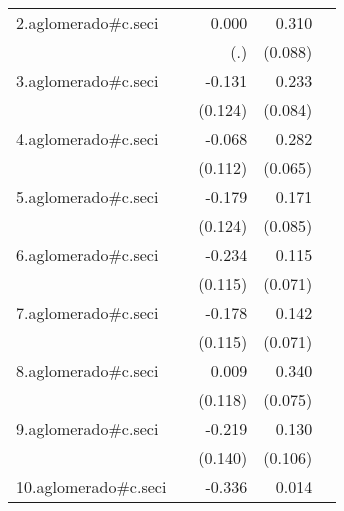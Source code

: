{\begin{longtable}{l*{4}{D{.}{.}{-1}}}
\addlinespace
2.aglomerado#c.seci&                     &       0.000         &       0.310\sym{***}&                     \\
            &                     &         (.)         &     (0.088)         &                     \\
\addlinespace
3.aglomerado#c.seci&                     &      -0.131         &       0.233\sym{**} &                     \\
            &                     &     (0.124)         &     (0.084)         &                     \\
\addlinespace
4.aglomerado#c.seci&                     &      -0.068         &       0.282\sym{***}&                     \\
            &                     &     (0.112)         &     (0.065)         &                     \\
\addlinespace
5.aglomerado#c.seci&                     &      -0.179         &       0.171\sym{*}  &                     \\
            &                     &     (0.124)         &     (0.085)         &                     \\
\addlinespace
6.aglomerado#c.seci&                     &      -0.234\sym{*}  &       0.115         &                     \\
            &                     &     (0.115)         &     (0.071)         &                     \\
\addlinespace
7.aglomerado#c.seci&                     &      -0.178         &       0.142\sym{*}  &                     \\
            &                     &     (0.115)         &     (0.071)         &                     \\
\addlinespace
8.aglomerado#c.seci&                     &       0.009         &       0.340\sym{***}&                     \\
            &                     &     (0.118)         &     (0.075)         &                     \\
\addlinespace
9.aglomerado#c.seci&                     &      -0.219         &       0.130         &                     \\
            &                     &     (0.140)         &     (0.106)         &                     \\
\addlinespace
10.aglomerado#c.seci&                     &      -0.336\sym{**} &       0.014         &                     \\

\end{longtable}}
